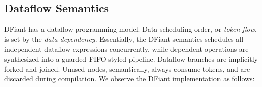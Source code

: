 %
%



\subsection{Dataflow Semantics}
DFiant has a dataflow programming model. Data scheduling order, or \textit{token-flow}, is set by the \textit{data dependency}. Essentially, the DFiant semantics schedules all independent dataflow expressions concurrently, while dependent operations are synthesized into a guarded FIFO-styled pipeline. Dataflow branches are implicitly forked and joined. Unused nodes, semantically, always consume tokens, and are discarded during compilation. We observe the DFiant  implementation as follows:

